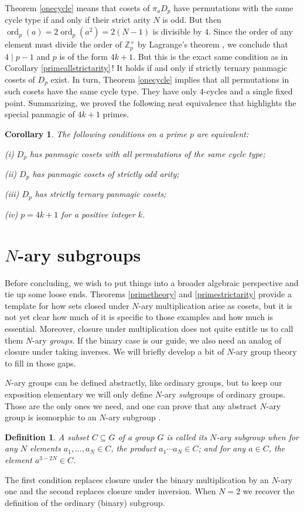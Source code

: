 \documentclass[11pt]{article}
\theoremstyle{plain}
\newtheorem{corollary}{Corollary}
\newtheorem{definition}{Definition}
\theoremstyle{definition}
\newcommand{\+}[1]{{#1}^\times}
\DeclareMathOperator{\ord}{ord}
\def\Z{{\mathbb Z}}
\begin{document}
Theorem \ref{onecycle} means that cosets of $\pi_aD_p$ have permutations with the same cycle type if and only if their strict arity $N$ is odd. But then $\ord_p(a)=2\ord_p(a^2)=2(N-1)$ is divisible by $4$. Since the order of any element must divide the order of $\Z_p^{\times}$ by Lagrange's theorem \cite{Gallian}, we conclude that $4\mid p-1$ and $p$ is of the form $4k+1$. But this is the exact same condition as in Corollary \ref{primeallstrictarity}\,! It holds if and only if strictly ternary panmagic cosets of $D_p$ exist. In turn, Theorem \ref{onecycle} implies that all permutations in such cosets have the same cycle type. They have only $4$-cycles and a single fixed point. Summarizing, we proved the following neat equivalence that highlights the special panmagic of $4k+1$ primes.
\begin{corollary}\label{4cyc}
The following conditions on a prime $p$ are equivalent: 

\textup{(i)} $D_p$ has panmagic cosets with all permutations of the same cycle type; 

\textup{(ii)} $D_p$ has panmagic cosets of strictly odd arity; 

\textup{(iii)} $D_p$ has strictly ternary panmagic cosets;

\textup{(iv)} $p=4k+1$ for a positive integer $k$.
\end{corollary}




\section{$N$-ary subgroups}\label{NarySub}

Before concluding, we wish to put things into a broader algebraic perspective and tie up some loose ends. Theorems \ref{primetheory} and \ref{primestrictarity} provide a template for how sets closed under $N$-ary multiplication arise as cosets, but it is not yet clear how much of it is specific to those examples and how much is essential. Moreover, closure under multiplication does not quite entitle us to call them $N$-ary {\it groups}. If the binary case is our guide, we also need an analog of closure under taking inverses. We will briefly develop a bit of $N$-ary group theory to fill in those gaps.

$N$-ary groups can be defined abstractly, like ordinary groups, but to keep our exposition elementary we will only define $N$-ary {\it sub}groups of ordinary groups. Those are the only ones we need, and one can prove that any abstract $N$-ary group is isomorphic to an $N$-ary subgroup \cite{GBV,Shah}.  
\begin{definition}\label{NaryG}
A subset $C\subseteq G$ of a group $G$ is called its $N$-ary subgroup when for any $N$ elements $a_1,\dots,a_N\in C$, the product $a_1\cdots a_N\in C$; and for any $a\in C$, the element $a^{3-2N}\in C$. 
\end{definition} 
\noindent The first condition replaces closure under the binary multiplication by an $N$-ary one and the second replaces closure under inversion. When $N=2$ we recover the definition of the ordinary (binary) subgroup. 
\end{document}
